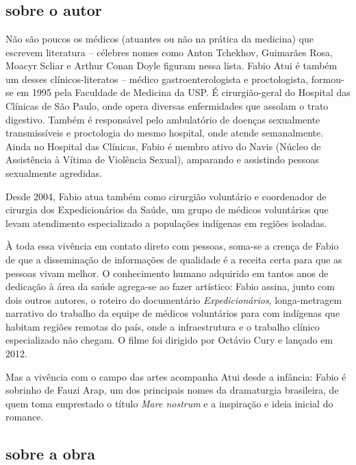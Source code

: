 \chapter*{}

\section{sobre o autor}


Não são poucos os médicos (atuantes ou não na prática da medicina) que escrevem literatura – célebres nomes como Anton Tchekhov, Guimarães Rosa, Moacyr Scliar e Arthur Conan Doyle figuram nessa lista. Fabio Atui é também um desses clínicos-literatos – médico gastroenterologista e proctologista, formou-se em 1995 pela Faculdade de Medicina da USP. É cirurgião-geral do Hospital das Clínicas de São Paulo, onde opera diversas enfermidades que assolam o trato digestivo. Também é responsável pelo ambulatório de doenças sexualmente transmissíveis e proctologia do mesmo hospital, onde atende semanalmente. Ainda no Hospital das Clínicas, Fabio é membro ativo do Navis (Núcleo de Assistência à Vítima de Violência Sexual), amparando e assistindo pessoas sexualmente agredidas.

Desde 2004, Fabio atua também como cirurgião voluntário e coordenador de cirurgia dos Expedicionários da Saúde, um grupo de médicos voluntários que levam atendimento especializado a populações indígenas em regiões isoladas. 

À toda essa vivência em contato direto com pessoas, soma-se a crença de Fabio de que a disseminação de informações de qualidade é a receita certa para que as pessoas vivam melhor. O conhecimento humano adquirido em tantos anos de dedicação à área da saúde agrega-se ao fazer artístico: Fabio assina, junto com dois outros autores, o roteiro do documentário \emph{Expedicionários}, longa-metragem narrativo do trabalho da equipe de médicos voluntários para com indígenas que habitam regiões remotas do país, onde a infraestrutura e o trabalho clínico especializado não chegam. O filme foi dirigido por Octávio Cury e lançado em 2012. 

Mas a vivência com o campo das artes acompanha Atui desde a infância: Fabio é sobrinho de Fauzi Arap, um dos principais nomes da dramaturgia brasileira, de quem toma emprestado o título \emph{Mare nostrum} e a inspiração e ideia inicial do romance.

\section{sobre a obra}

